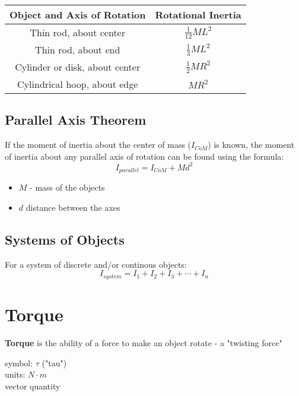 \documentclass[titlepage]{article}
\begin{document}
\begin{table}[H]
    \centering
    \makegapedcells

    \begin{tabular}{c|c}
        \textbf{Object and Axis of Rotation} & \textbf{Rotational Inertia} \\
        \hline
        Thin rod, about center               & $\frac{1}{12}ML^2$          \\
        Thin rod, about end                  & $\frac{1}{3}ML^2$           \\
        Cylinder or disk, about center       & $\frac{1}{2} MR^2$          \\
        Cylindrical hoop, about edge         & $MR^2$
    \end{tabular}
\end{table}

\subsection{Parallel Axis Theorem}
If the moment of inertia about the center of mass ($I_{CoM}$) is known, the moment of inertia about any parallel axis of rotation can be found using the formula:
\begin{equation*}
    I_{parallel} = I_{CoM} + Md^2
\end{equation*}

\begin{itemize}
    \item $M$ - mass of the objects
    \item $d$ distance between the axes
\end{itemize}

\subsection{Systems of Objects}
For a system of discrete and/or continous objects:
\begin{equation*}
    I_{system} = I_1 + I_2 + I_3 + \cdots + I_n
\end{equation*}

\section{Torque}
\textbf{Torque} is the ability of a force to make an object rotate - a "twisting force"

symbol: $\tau$ ("tau") \\
units: $N \cdot m$ \\
vector quantity
\end{document}
